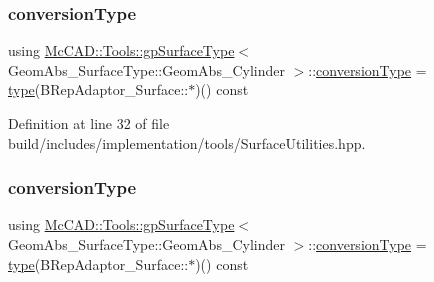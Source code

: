 \subsubsection{\texorpdfstring{conversion\+Type}{conversionType}\hspace{0.1cm}{\footnotesize\ttfamily [1/2]}}
{\footnotesize\ttfamily using \hyperlink{structMcCAD_1_1Tools_1_1gpSurfaceType}{Mc\+C\+A\+D\+::\+Tools\+::gp\+Surface\+Type}$<$ Geom\+Abs\+\_\+\+Surface\+Type\+::\+Geom\+Abs\+\_\+\+Cylinder $>$\+::\hyperlink{structMcCAD_1_1Tools_1_1gpSurfaceType_3_01GeomAbs__SurfaceType_1_1GeomAbs__Cylinder_01_4_aeb0860ae6aba6767a3c8eecc5089087c}{conversion\+Type} =  \hyperlink{structMcCAD_1_1Tools_1_1gpSurfaceType_3_01GeomAbs__SurfaceType_1_1GeomAbs__Cylinder_01_4_aba440b967c5c31905e30cf460c016e56}{type}(B\+Rep\+Adaptor\+\_\+\+Surface\+::$\ast$)() const}



Definition at line 32 of file build/includes/implementation/tools/\+Surface\+Utilities.\+hpp.

\mbox{\label{structMcCAD_1_1Tools_1_1gpSurfaceType_3_01GeomAbs__SurfaceType_1_1GeomAbs__Cylinder_01_4_aeb0860ae6aba6767a3c8eecc5089087c}} 
\subsubsection{\texorpdfstring{conversion\+Type}{conversionType}\hspace{0.1cm}{\footnotesize\ttfamily [2/2]}}
{\footnotesize\ttfamily using \hyperlink{structMcCAD_1_1Tools_1_1gpSurfaceType}{Mc\+C\+A\+D\+::\+Tools\+::gp\+Surface\+Type}$<$ Geom\+Abs\+\_\+\+Surface\+Type\+::\+Geom\+Abs\+\_\+\+Cylinder $>$\+::\hyperlink{structMcCAD_1_1Tools_1_1gpSurfaceType_3_01GeomAbs__SurfaceType_1_1GeomAbs__Cylinder_01_4_aeb0860ae6aba6767a3c8eecc5089087c}{conversion\+Type} =  \hyperlink{structMcCAD_1_1Tools_1_1gpSurfaceType_3_01GeomAbs__SurfaceType_1_1GeomAbs__Cylinder_01_4_aba440b967c5c31905e30cf460c016e56}{type}(B\+Rep\+Adaptor\+\_\+\+Surface\+::$\ast$)() const}



